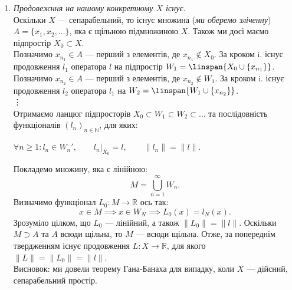 \documentclass{math_library}
\begin{document}
\begin{enumerate}[wide=0pt,label={\roman*.}]
\begin{itemize}[wide=0pt]
\item \textit{Випадок при $\lambda < 0$}.\\
Перепишемо елемент ось так:
\[
z = -(-x + (-\lambda)y).
\]
У нас тепер $-\lambda > 0$ та $-z = t = -x + (-\lambda)y$, звідси отримаємо
\[
|\tilde{l}(t)| \leq \|l\| \|t\| \implies |\tilde{l}(x)| \leq \|l\| \|x\|.
\]
\end{itemize}

\item \textit{Продовежння на нашому конкретному $X$ існує}.\\
Оскільки $X$ --- сепарабельний, то існує множина (\textit{ми оберемо зліченну}) $A = \{x_1,x_2,\dots\}$, яка є щільною підмножиною $X$. Також ми досі маємо підпростір $X_0 \subset X$.\\
Позначимо $x_{n_1} \in A$ --- перший з елементів, де $x_{n_1} \notin X_0$. За кроком i. існує продовження $l_1$ оператора $l$ на підпростір $W_1 = \linspan\{X_0 \cup \{x_{n_1}\}\}$.\\
Позначимо $x_{n_2} \in A$ --- перший з елементів, де $x_{n_2} \notin W_1$. За кроком i. існує продовження $l_2$ оператора $l_1$ на $W_2 = \linspan\{W_1 \cup \{x_{n_2}\}\}$.\\
\vdots \\
Отримаємо ланцюг підпросторів $X_0 \subset W_1 \subset W_2 \subset \dots$ та послідовність функціоналів $(l_n)_{n \in \mathbb{N}}$, для яких:
\begin{center}
$\forall n \geq 1: l_n \in W_n',\qquad {l_n}|_{X_0} = l, \qquad \|l_n\| = \|l\|$.
\end{center}
Покладемо множину, яка є лінійною:
\[
M = \displaystyle\bigcup_{n=1}^\infty W_n.
\]
Визначимо функціонал $L_0 \colon M \to \mathbb{R}$ ось так: 
\[
x \in M \implies x \in W_N \implies L_0(x) = l_N(x).
\]
Зрозуміло цілком, що $L_0$ --- лінійний, а також $\|L_0\| = \|l\|$. Оскільки $M \supset A$ та $A$ всюди щільна, то $M$ --- всюди щільна. Отже, за попереднім твердженням існує продовження $L \colon X \to \mathbb{R}$, для якого $\|L\| = \|L_0\| = \|l\|$.
\bigskip \\
Висновок: ми довели теорему Гана-Банаха для випадку, коли $X$ --- дійсний, сепарабельний простір.
\end{enumerate}
\end{document}
